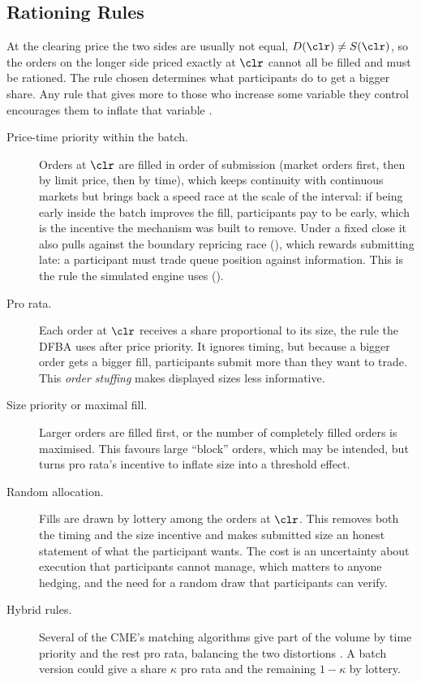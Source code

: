\subsection{Rationing Rules}
\label{sec:rationing}

At the clearing price the two sides are usually not equal, $D(\clr) \neq
S(\clr)$, so the orders on the longer side priced exactly at $\clr$ cannot all
be filled and must be rationed. The rule chosen determines what participants
do to get a bigger share. Any rule that gives more to those who increase some
variable they control encourages them to inflate that variable
\citep{haynes2020precedence}.

\begin{description}
  \item[Price-time priority within the batch.] Orders at $\clr$ are filled in
  order of submission (market orders first, then by limit price, then by
  time), which keeps continuity with continuous markets but brings back a
  speed race at the scale of the interval: if being early inside the batch
  improves the fill, participants pay to be early, which is the incentive
  the mechanism was built to remove. Under a fixed close it also pulls
  against the boundary repricing race (), which
  rewards submitting late: a participant must trade queue position against
  information. This is the rule the simulated engine uses
  ().
  \item[Pro rata.] Each order at $\clr$ receives a share proportional to its
  size, the rule the DFBA uses after price priority. It ignores timing, but
  because a bigger order gets a bigger fill, participants submit more than they
  want to trade. This \emph{order stuffing} makes displayed sizes less
  informative.
  \item[Size priority or maximal fill.] Larger orders are filled first, or the
  number of completely filled orders is maximised. This favours large
  ``block'' orders, which may be intended, but turns pro rata's incentive to
  inflate size into a threshold effect.
  \item[Random allocation.] Fills are drawn by lottery among the orders at
  $\clr$. This removes both the timing and the size incentive and makes
  submitted size an honest statement of what the participant wants. The cost is
  an uncertainty about execution that participants cannot manage, which
  matters to anyone hedging, and the need for a random draw that participants
  can verify.
  \item[Hybrid rules.] Several of the CME's matching algorithms give part of
  the volume by time priority and the rest pro rata, balancing the two
  distortions \citep{haynes2020precedence}. A
  batch version could give a share $\kappa$ pro rata and the remaining
  $1 - \kappa$ by lottery.
\end{description}

